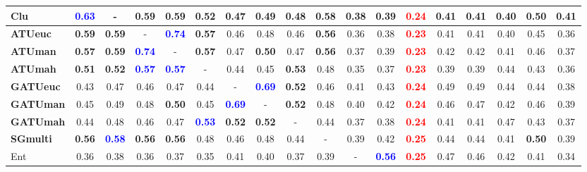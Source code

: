 \begin{table}[h]
\begin{center}
{\begin{tabular}{lcc|cc|cc|cc|cc|cc|cc|cc|c}
Clu	& \textcolor{blue}{\textbf{  0.63}} & - & \textbf{  0.59} & \textbf{  0.59} & \textbf{  0.52} &   0.47 &   0.49 &   0.48 & \textbf{  0.58} &   0.38 &   0.39 & \textcolor{red}{\textbf{  0.24}} &   0.41 &   0.41 &   0.40 & \textbf{  0.50} &   0.41 \\ \hline
\textbf{ATUeuc}	& \textbf{  0.59} & \textbf{  0.59} & - & \textcolor{blue}{\textbf{  0.74}} & \textbf{  0.57} &   0.46 &   0.48 &   0.46 & \textbf{  0.56} &   0.36 &   0.38 & \textcolor{red}{\textbf{  0.23}} &   0.41 &   0.41 &   0.40 &   0.45 &   0.36 \\
\textbf{ATUman}	& \textbf{  0.57} & \textbf{  0.59} & \textcolor{blue}{\textbf{  0.74}} & - & \textbf{  0.57} &   0.47 & \textbf{  0.50} &   0.47 & \textbf{  0.56} &   0.37 &   0.39 & \textcolor{red}{\textbf{  0.23}} &   0.42 &   0.42 &   0.41 &   0.46 &   0.37 \\ \hline
\textbf{ATUmah}	& \textbf{  0.51} & \textbf{  0.52} & \textcolor{blue}{\textbf{  0.57}} & \textcolor{blue}{\textbf{  0.57}} & - &   0.44 &   0.45 & \textbf{  0.53} &   0.48 &   0.35 &   0.37 & \textcolor{red}{\textbf{  0.23}} &   0.39 &   0.39 &   0.44 &   0.43 &   0.36 \\
\textbf{GATUeuc}	&   0.43 &   0.47 &   0.46 &   0.47 &   0.44 & - & \textcolor{blue}{\textbf{  0.69}} & \textbf{  0.52} &   0.46 &   0.41 &   0.43 & \textcolor{red}{\textbf{  0.24}} &   0.49 &   0.49 &   0.44 &   0.44 &   0.38 \\ \hline
\textbf{GATUman}	&   0.45 &   0.49 &   0.48 & \textbf{  0.50} &   0.45 & \textcolor{blue}{\textbf{  0.69}} & - & \textbf{  0.52} &   0.48 &   0.40 &   0.42 & \textcolor{red}{\textbf{  0.24}} &   0.46 &   0.47 &   0.42 &   0.46 &   0.39 \\
\textbf{GATUmah}	&   0.44 &   0.48 &   0.46 &   0.47 & \textcolor{blue}{\textbf{  0.53}} & \textbf{  0.52} & \textbf{  0.52} & - &   0.44 &   0.37 &   0.38 & \textcolor{red}{\textbf{  0.24}} &   0.41 &   0.41 &   0.47 &   0.43 &   0.37 \\ \hline
\textbf{SGmulti}	& \textbf{  0.56} & \textcolor{blue}{\textbf{  0.58}} & \textbf{  0.56} & \textbf{  0.56} &   0.48 &   0.46 &   0.48 &   0.44 & - &   0.39 &   0.42 & \textcolor{red}{\textbf{  0.25}} &   0.44 &   0.44 &   0.41 & \textbf{  0.50} &   0.39 \\
Ent	&   0.36 &   0.38 &   0.36 &   0.37 &   0.35 &   0.41 &   0.40 &   0.37 &   0.39 & - & \textcolor{blue}{\textbf{  0.56}} & \textcolor{red}{\textbf{  0.25}} &   0.47 &   0.46 &   0.42 &   0.41 &   0.34 \\ \hline

\end{tabular}}
\end{center}
\end{table}
